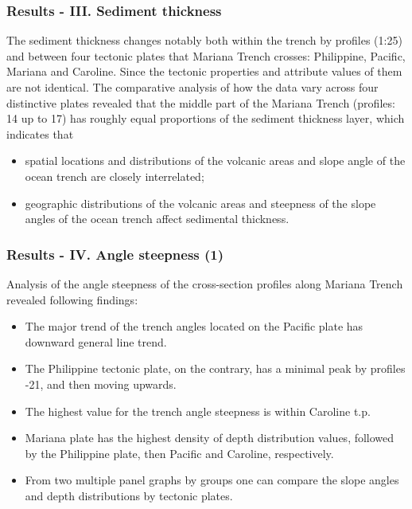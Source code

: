 \documentclass[pdflatex,compress,8pt,
	xcolor={dvipsnames,dvipsnames,svgnames,x11names,table},
	hyperref={colorlinks = true,breaklinks = true, urlcolor = NavyBlue, breaklinks = true}]{beamer}
\begin{document}
\begin{frame}\frametitle{Results - III. Sediment thickness}
The sediment thickness changes notably both within the trench by profiles (1:25) and between four tectonic plates that Mariana Trench crosses: Philippine, Pacific, Mariana and Caroline. Since the tectonic properties and attribute values of them are not identical. The comparative analysis of how the data vary across four distinctive plates revealed that the middle part of the Mariana Trench (profiles: 14 up to 17) has roughly equal proportions of the sediment thickness layer, which indicates that
    	\begin{itemize}
    		 \item spatial locations and distributions of the volcanic areas and slope angle of the ocean trench are closely interrelated; 
		 \item geographic distributions of the volcanic areas and steepness of the slope angles of the ocean trench affect sedimental thickness. 
	\end{itemize}
\end{frame}
	
\begin{frame}\frametitle{Results - IV. Angle steepness (1)}
Analysis of the angle steepness of the cross-section profiles along Mariana Trench revealed following findings:
    	\begin{itemize}
		 \item The major trend of the trench angles located on the Pacific plate has downward general line trend. 
		 \item The Philippine tectonic plate, on the contrary, has a minimal peak by profiles \textnumero {}-21, and then moving upwards. 
		 \item The highest value for the trench angle steepness is within Caroline t.p. 
		 \item Mariana plate has the highest density of depth distribution values, followed by the Philippine plate, then Pacific and Caroline, respectively. 
		 \item From two multiple panel graphs by groups one can compare the slope angles and depth distributions by tectonic plates. 
	\end{itemize}
\end{frame}
\end{document}
